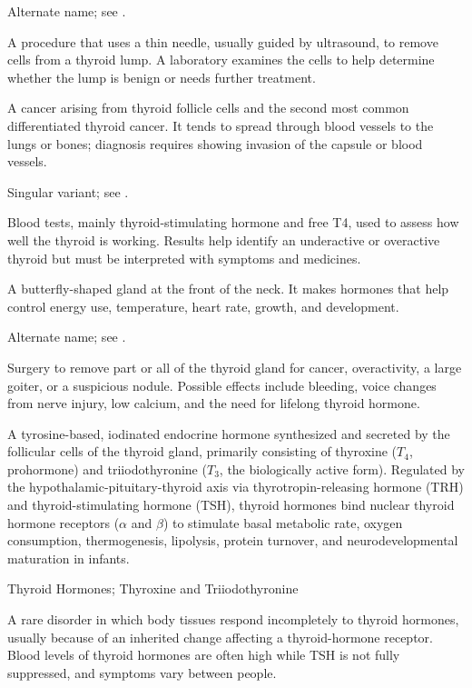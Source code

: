  Alternate name; see .

 A procedure that uses a thin needle, usually guided by ultrasound, to remove cells from a thyroid lump. A laboratory examines the cells to help determine whether the lump is benign or needs further treatment.

 A cancer arising from thyroid follicle cells and the second most common differentiated thyroid cancer. It tends to spread through blood vessels to the lungs or bones; diagnosis requires showing invasion of the capsule or blood vessels.

 Singular variant; see .

 Blood tests, mainly thyroid-stimulating hormone and free T4, used to assess how well the thyroid is working. Results help identify an underactive or overactive thyroid but must be interpreted with symptoms and medicines.

 A butterfly-shaped gland at the front of the neck. It makes hormones that help control energy use, temperature, heart rate, growth, and development.

 Alternate name; see .

 Surgery to remove part or all of the thyroid gland for cancer, overactivity, a large goiter, or a suspicious nodule. Possible effects include bleeding, voice changes from nerve injury, low calcium, and the need for lifelong thyroid hormone.

 A tyrosine-based, iodinated endocrine hormone synthesized and secreted by the follicular cells of the thyroid gland, primarily consisting of thyroxine ($T_4$, prohormone) and triiodothyronine ($T_3$, the biologically active form). Regulated by the hypothalamic-pituitary-thyroid axis via thyrotropin-releasing hormone (TRH) and thyroid-stimulating hormone (TSH), thyroid hormones bind nuclear thyroid hormone receptors ($\alpha$ and $\beta$) to stimulate basal metabolic rate, oxygen consumption, thermogenesis, lipolysis, protein turnover, and neurodevelopmental maturation in infants.

\synonyms
Thyroid Hormones; Thyroxine and Triiodothyronine

 A rare disorder in which body tissues respond incompletely to thyroid hormones, usually because of an inherited change affecting a thyroid-hormone receptor. Blood levels of thyroid hormones are often high while TSH is not fully suppressed, and symptoms vary between people.

